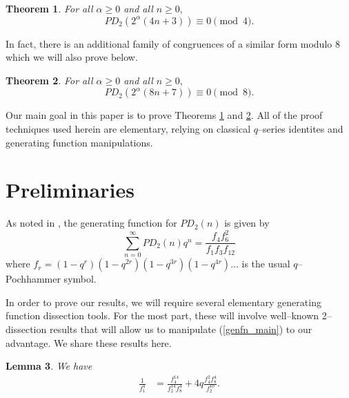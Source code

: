 \documentclass{amsart}
\newtheorem{theorem}{Theorem}[section]
\newtheorem{lemma}[theorem]{Lemma}
\begin{document}
\begin{theorem}
\label{infinite_family_mod4}
For all $\alpha \geq 0$ and all $n\geq 0,$
$$PD_2(2^\alpha(4n+3)) \equiv 0 \pmod{4}.$$
\end{theorem}
In fact, there is an additional family of congruences of a similar form modulo 8 which we will also prove below.  

\begin{theorem}
\label{infinite_family_mod8}
For all $\alpha \geq 0$ and all $n\geq 0,$
$$PD_2(2^\alpha(8n+7)) \equiv 0 \pmod{8}.$$  
\end{theorem}


Our main goal in this paper is to prove Theorems \ref{infinite_family_mod4} and \ref{infinite_family_mod8}.  All of the proof techniques used herein are elementary, relying on classical $q$--series  identites and generating function manipulations.  



\section{Preliminaries}

As noted in \cite{ALL}, the generating function for $PD_2(n)$ is given by 
\begin{equation}
    \label{genfn_main}
    \sum_{n=0}^{\infty} PD_2(n)q^n = \frac{f_4f_6^2}{f_1f_3f_{12}}
\end{equation}
where $f_r = (1-q^r)(1-q^{2r})(1-q^{3r})(1-q^{4r})\dots$ is the usual $q$--Pochhammer symbol.

In order to prove our results, we will require several elementary generating function dissection tools.  For the most part, these will involve well--known 2--dissection results that will allow us to manipulate (\ref{genfn_main}) to our advantage.  We share these results here.  

\begin{lemma}
\label{L4}
We have
\begin{align*}
\frac{1}{f_1^4} & = \frac{f_4^{14}}{f_2^{14}f_{8}^4} + 4q \frac{f_4^2f_{8}^4}{f_2^{10}}. \\
\end{align*}
\end{lemma}
\end{document}
